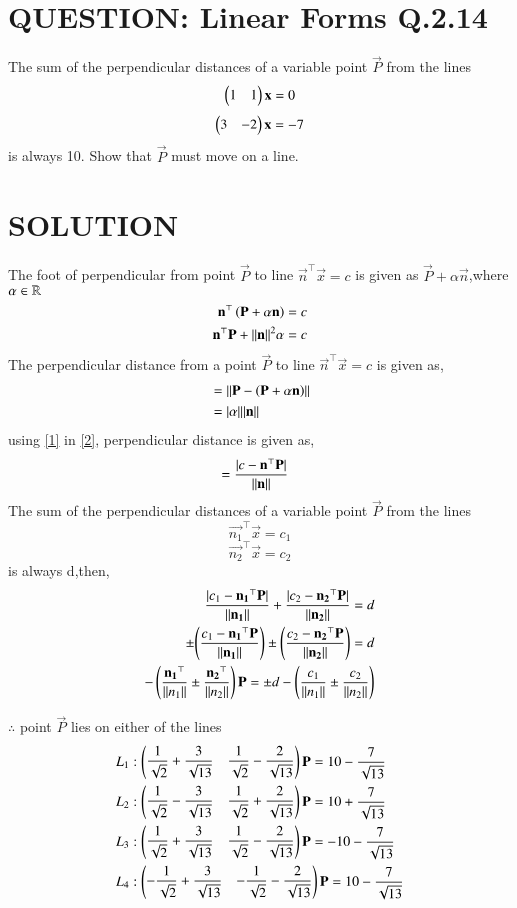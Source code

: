 \documentclass[journal,12pt,twocolumn]{IEEEtran}
\begin{document}
\section{QUESTION: Linear Forms Q.2.14}
The sum of the perpendicular distances of a variable point $\vec{P}$ from the lines 
$$\begin{pmatrix}1&1\end{pmatrix} \mathbf{x} = 0$$
$$\begin{pmatrix}3&-2\end{pmatrix} \mathbf{x} = -7$$
is always 10. Show that $\vec{P}$ must move on a line.

\section{SOLUTION}
The foot of perpendicular from point $\vec{P}$ to line $ \vec{n}^{\top }\vec{x} =c$ is given as $\vec{P} + \alpha \vec{n}$,where $\alpha \in \mathbb{R}$
\begin{align}
\mathbf{n}^{\top }\left(\mathbf{P} + \alpha\mathbf{n}\right) = c\\
 \mathbf{n}^{\top }\mathbf{P} + \lVert\mathbf{n}\rVert^{2}\alpha =c \label{1}
\end{align}
The perpendicular distance from a point $\vec{P}$ to line $ \vec{n}^{\top }\vec{x} =c$ is given as,
\begin{align}
&=\lVert\mathbf{P} - \left(\mathbf{P} + \alpha\mathbf{n}\right)\rVert\\
&=\vert\alpha\vert\lVert\mathbf{n}\rVert \label{2}
\end{align}
using \eqref{1} in \eqref{2}, perpendicular distance is given as,
\begin{align}
&=\dfrac{\vert c- \mathbf{n}^{\top }\mathbf{P}\vert}{\lVert\mathbf{n}\rVert} \label{3}
\end{align}
The sum of the perpendicular distances of a variable point $\vec{P}$ from the lines 
$$\vec{n_{1}}^{\top } \vec{x} = c_{1}$$
$$\vec{n_{2}}^{\top } \vec{x} = c_{2}$$
is always d,then,
\begin{align}
\dfrac{\vert c_{1}- \mathbf{n_{1}}^{\top }\mathbf{P}\vert}{\lVert\mathbf{n_{1}}\rVert}+ \dfrac{\vert c_{2}- \mathbf{n_{2}}^{\top }\mathbf{P}\vert}{\lVert\mathbf{n_{2}}\rVert} = d\\
\pm{\ensuremath{\left(\dfrac{{c_{1}- \mathbf{n_{1}}^{\top }\mathbf{P}}}{\lVert\mathbf{n_{1}}\rVert}\right)}} \pm{\ensuremath{\left(\dfrac{{c_{2}- \mathbf{n_{2}}^{\top }\mathbf{P}}}{\lVert\mathbf{n_{2}}\rVert}\right)}} = d\\
-\left(\dfrac{\mathbf{n_{1}}^{\top }}{\lVert n_{1}\rVert} \pm \dfrac{\mathbf{n_{2}}^{\top }}{\lVert n_{2}\rVert}\right)\mathbf{P} = \pm d -\left(\dfrac{c_{1}}{\lVert n_{1}\rVert} \pm \dfrac{c_{2}}{\lVert n_{2}\rVert}\right)
\end{align}

$\therefore$ point $\vec{P}$ lies on either of the lines
\begin{align}
L_1&:\begin{pmatrix}\dfrac{1}{\sqrt{2}}+\dfrac{3}{\sqrt{13}}& \dfrac{1}{\sqrt{2}}-\dfrac{2}{\sqrt{13}}\end{pmatrix}\mathbf{P} = 10 - \dfrac{7}{\sqrt{13}}\\
L_2&:\begin{pmatrix}\dfrac{1}{\sqrt{2}}-\dfrac{3}{\sqrt{13}}& \dfrac{1}{\sqrt{2}}+\dfrac{2}{\sqrt{13}}\end{pmatrix}\mathbf{P} = 10 + \dfrac{7}{\sqrt{13}}\\
L_3&:\begin{pmatrix}\dfrac{1}{\sqrt{2}}+\dfrac{3}{\sqrt{13}}& \dfrac{1}{\sqrt{2}}-\dfrac{2}{\sqrt{13}}\end{pmatrix}\mathbf{P} = -10 - \dfrac{7}{\sqrt{13}}\\
L_4&:\begin{pmatrix}-\dfrac{1}{\sqrt{2}}+\dfrac{3}{\sqrt{13}}& -\dfrac{1}{\sqrt{2}}-\dfrac{2}{\sqrt{13}}\end{pmatrix}\mathbf{P} = 10 - \dfrac{7}{\sqrt{13}}
\end{align}
\end{document}
